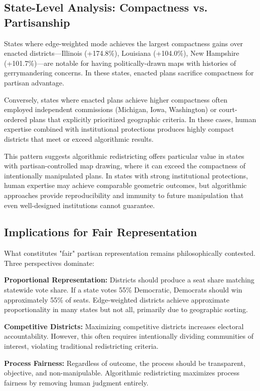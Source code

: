 \subsection{State-Level Analysis: Compactness vs. Partisanship}

States where edge-weighted mode achieves the largest compactness gains over enacted districts—Illinois (+174.8\%), Louisiana (+104.0\%), New Hampshire (+101.7\%)—are notable for having politically-drawn maps with histories of gerrymandering concerns. In these states, enacted plans sacrifice compactness for partisan advantage.

Conversely, states where enacted plans achieve higher compactness often employed independent commissions (Michigan, Iowa, Washington) or court-ordered plans that explicitly prioritized geographic criteria. In these cases, human expertise combined with institutional protections produces highly compact districts that meet or exceed algorithmic results.

This pattern suggests algorithmic redistricting offers particular value in states with partisan-controlled map drawing, where it can exceed the compactness of intentionally manipulated plans. In states with strong institutional protections, human expertise may achieve comparable geometric outcomes, but algorithmic approaches provide reproducibility and immunity to future manipulation that even well-designed institutions cannot guarantee.

\subsection{Implications for Fair Representation}

What constitutes "fair" partisan representation remains philosophically contested. Three perspectives dominate:

\textbf{Proportional Representation:} Districts should produce a seat share matching statewide vote share. If a state votes 55\% Democratic, Democrats should win approximately 55\% of seats. Edge-weighted districts achieve approximate proportionality in many states but not all, primarily due to geographic sorting.

\textbf{Competitive Districts:} Maximizing competitive districts increases electoral accountability. However, this often requires intentionally dividing communities of interest, violating traditional redistricting criteria.

\textbf{Process Fairness:} Regardless of outcome, the process should be transparent, objective, and non-manipulable. Algorithmic redistricting maximizes process fairness by removing human judgment entirely.

